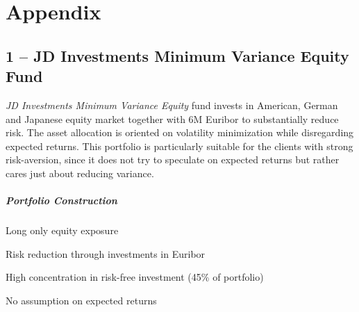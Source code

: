 \documentclass[11pt, parskip=full, DIV=14]{scrreprt}
\begin{document}
\newpage
\chapter{Appendix}
\section*{1 -- JD Investments Minimum Variance Equity Fund}
\textit{JD Investments Minimum Variance Equity} fund invests in American, German and Japanese equity market together with 6M Euribor to substantially reduce risk.
The asset allocation is oriented on volatility minimization while disregarding expected returns.
This portfolio is particularly suitable for the clients with strong risk-aversion, since it does not try to speculate on expected returns but rather cares just about reducing variance.

\paragraph{Portfolio Construction}
\begin{sit}
\item Long only equity exposure
\item Risk reduction through investments in Euribor
\item High concentration in risk-free investment (45\% of portfolio)
\item No assumption on expected returns
\end{sit}

\begin{figure}[H]
\end{figure}
\end{document}
